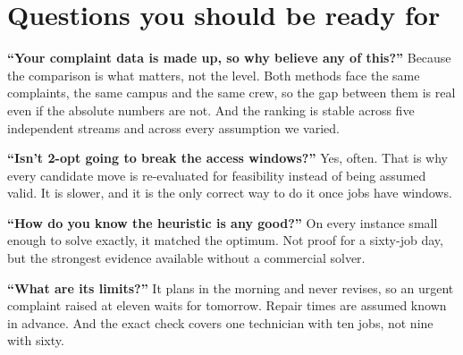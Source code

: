 \documentclass[11pt]{article}
\begin{document}
\section{Questions you should be ready for}

\textbf{``Your complaint data is made up, so why believe any of this?''}
Because the comparison is what matters, not the level. Both methods face the
same complaints, the same campus and the same crew, so the gap between them
is real even if the absolute numbers are not. And the ranking is stable
across five independent streams and across every assumption we varied.

\textbf{``Isn't 2-opt going to break the access windows?''} Yes, often. That
is why every candidate move is re-evaluated for feasibility instead of being
assumed valid. It is slower, and it is the only correct way to do it once
jobs have windows.

\textbf{``How do you know the heuristic is any good?''} On every instance
small enough to solve exactly, it matched the optimum. Not proof for a
sixty-job day, but the strongest evidence available without a commercial
solver.

\textbf{``What are its limits?''} It plans in the morning and never revises,
so an urgent complaint raised at eleven waits for tomorrow. Repair times are
assumed known in advance. And the exact check covers one technician with ten
jobs, not nine with sixty.
\end{document}
